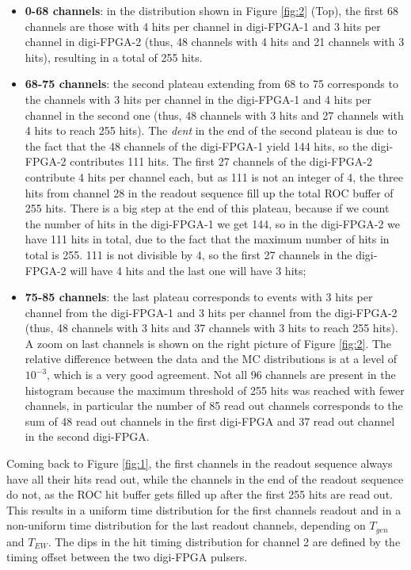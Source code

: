 \begin{itemize}
  \item \textbf{0-68 channels}: in the distribution shown 
  in Figure \ref{fig:2} (Top), the first 68 channels are 
  those with 4 hits per channel in digi-FPGA-1 and 3 hits per 
  channel in digi-FPGA-2 (thus, 48 channels with 4 hits and 21 
  channels with 3 hits), resulting in a total of 255 hits.
  \item \textbf{68-75 channels}: 
  the second plateau extending from 68 to 75 corresponds to the channels
  with 3 hits per channel in the digi-FPGA-1 and 4 hits per channel in the second one 
  (thus, 48 channels with 3 hits and 27 channels with 4 hits to reach 255 hits).
  The \textit{dent} in the end of the second plateau is due to the 
  fact that the 48 channels of the digi-FPGA-1 yield 144 hits, so 
  the digi-FPGA-2 contributes 111 hits. The first 27 channels of the digi-FPGA-2 contribute
  4 hits per channel each, but as 111 is not an integer of 4, 
  the three hits from channel 28 in the readout sequence
  fill up the total ROC buffer of 255 hits. There is a big step at the 
  end of this plateau, because if we count the number of hits
  in the digi-FPGA-1 we get 144, so in the digi-FPGA-2 we have 111 hits in total,
  due to the fact that the maximum number of hits in total is 255.
  111 is not divisible by 4, so the first 27 channels in the digi-FPGA-2 will have 4 hits
  and the last one will have 3 hits;
  \item \textbf{75-85 channels}: the last plateau corresponds to events 
  with 3 hits per channel from the digi-FPGA-1 and 3 hits per channel from the digi-FPGA-2 
  (thus, 48 channels with 3 hits and 37 channels with 3 hits to reach 255 hits).
  A zoom on last channels is shown on the right picture of Figure \ref{fig:2}.
  The relative difference between the data and the MC distributions 
  is at a level of $10^{-3}$, which is a very good agreement.
  Not all 96 channels are present in the histogram because the maximum 
  threshold of 255 hits was reached with fewer channels, in particular the number of 
  85 read out channels corresponds to the sum of 48 read out channels in the first 
  digi-FPGA and 37 read out channel in the second digi-FPGA.
\end{itemize}




Coming back to Figure \ref{fig:1}, the first channels in the readout sequence
always have all their hits read out,
while the channels in the end of the readout sequence do not,
as the ROC hit buffer gets filled up after
the first 255 hits are read out.
This results in a uniform time distribution for the first channels readout and in a non-uniform
time distribution for the last readout channels, depending on $T_{gen}$ and $T_{EW}$.
The dips in the hit timing distribution for channel 2 are defined by the timing offset
between the two digi-FPGA pulsers. 


